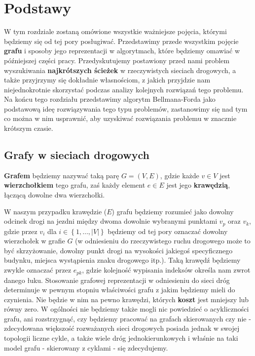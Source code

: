 \chapter{Podstawy}

W tym rozdziale zostaną omówione wszystkie ważniejsze pojęcia, którymi będziemy się od tej pory posługiwać. Przedstawimy przede wszystkim pojęcie \textbf{grafu} i sposoby jego reprezentacji w algorytmach, które będziemy omawiać w późniejszej części pracy. Przedyskutujemy postawiony przed nami problem wyszukiwania \textbf{najkrótszych ścieżek} w rzeczywistych sieciach drogowych, a także przyjrzymy się dokładnie własnościom, z jakich przyjdzie nam niejednokrotnie skorzystać podczas analizy kolejnych rozwiązań tego problemu. Na końcu tego rozdziału przedstawimy algorytm Bellmana-Forda jako podstawową ideę rozwiązywania tego typu problemów, zastanowimy się nad tym co można w nim usprawnić, aby uzyskiwać rozwiązania problemu w znacznie krótszym czasie.

\section{Grafy w sieciach drogowych}

\textbf{Grafem} będziemy nazywać taką parę $G = \left( V, E \right) $, gdzie każde $v \in V$ jest \textbf{wierzchołkiem} tego grafu, zaś każdy element $e \in E$ jest jego \textbf{krawędzią}, łączącą dowolne dwa wierzchołki.

W naszym przypadku krawędzie ($E$) grafu będziemy rozumieć jako dowolny odcinek drogi na jezdni między dwoma dowolnie wybranymi punktami $v_{p}$ oraz $v_{k}$, gdzie przez $v_{i}$ dla $i \in \left\{ 1, \ldots, \left| V \right| \right\}$ będziemy od tej pory oznaczać dowolny wierzchołek w grafie $G$ (w odniesieniu do rzeczywistego ruchu drogowego może to być skrzyżowanie, dowolny punkt drogi na wysokości jakiegoś specyficznego budynku, miejsca wystąpienia znaku drogowego itp.). Taką krawędź będziemy zwykle oznaczać przez $e_{pk}$, gdzie kolejność wypisania indeksów określa nam zwrot danego łuku. Stosowanie grafowej reprezentacji w odniesieniu do sieci dróg determinuje w pewnym stopniu właściwości grafu z jakim będziemy mieli do czynienia. Nie będzie w nim na pewno krawędzi, których \textbf{koszt} jest mniejszy lub równy zero. W ogólności nie będziemy także mogli nic powiedzieć o acykliczności grafu, ani rozstrzygnąć, czy będziemy pracować na grafach skierowanych czy nie - zdecydowana większość rozważanych sieci drogowych posiada jednak w swojej topologii liczne cykle, a także wiele dróg jednokierunkowych i właśnie na taki model grafu - skierowany z cyklami - się zdecydujemy.

